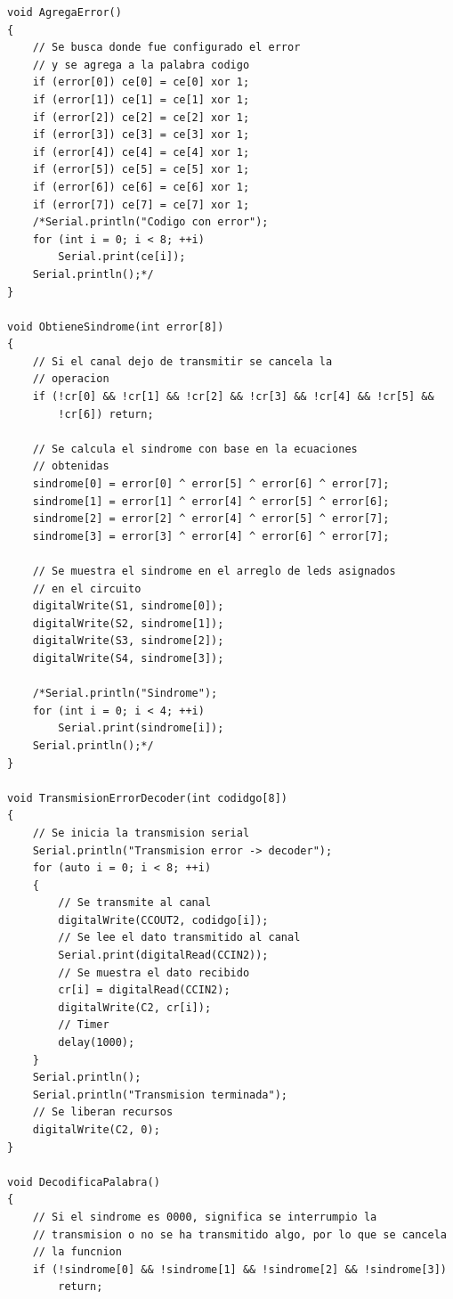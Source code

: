 \documentclass[12pt,letterpaper]{article}
\begin{document}
\begin{lstlisting}[style=CStyle]
void AgregaError()
{
	// Se busca donde fue configurado el error
	// y se agrega a la palabra codigo
	if (error[0]) ce[0] = ce[0] xor 1;
	if (error[1]) ce[1] = ce[1] xor 1;
	if (error[2]) ce[2] = ce[2] xor 1;
	if (error[3]) ce[3] = ce[3] xor 1;
	if (error[4]) ce[4] = ce[4] xor 1;
	if (error[5]) ce[5] = ce[5] xor 1;
	if (error[6]) ce[6] = ce[6] xor 1;
	if (error[7]) ce[7] = ce[7] xor 1;
	/*Serial.println("Codigo con error");
	for (int i = 0; i < 8; ++i)
		Serial.print(ce[i]);
	Serial.println();*/
}

void ObtieneSindrome(int error[8])
{
	// Si el canal dejo de transmitir se cancela la 
	// operacion
	if (!cr[0] && !cr[1] && !cr[2] && !cr[3] && !cr[4] && !cr[5] &&
		!cr[6]) return;

	// Se calcula el sindrome con base en la ecuaciones 
	// obtenidas
	sindrome[0] = error[0] ^ error[5] ^ error[6] ^ error[7];
	sindrome[1] = error[1] ^ error[4] ^ error[5] ^ error[6];
	sindrome[2] = error[2] ^ error[4] ^ error[5] ^ error[7];
	sindrome[3] = error[3] ^ error[4] ^ error[6] ^ error[7];

	// Se muestra el sindrome en el arreglo de leds asignados
	// en el circuito
	digitalWrite(S1, sindrome[0]);
	digitalWrite(S2, sindrome[1]);
	digitalWrite(S3, sindrome[2]);
	digitalWrite(S4, sindrome[3]);

	/*Serial.println("Sindrome");
	for (int i = 0; i < 4; ++i)
		Serial.print(sindrome[i]);
	Serial.println();*/
}

void TransmisionErrorDecoder(int codidgo[8])
{
	// Se inicia la transmision serial
	Serial.println("Transmision error -> decoder");
	for (auto i = 0; i < 8; ++i)
	{
		// Se transmite al canal
		digitalWrite(CCOUT2, codidgo[i]);
		// Se lee el dato transmitido al canal
		Serial.print(digitalRead(CCIN2));
		// Se muestra el dato recibido
		cr[i] = digitalRead(CCIN2);
		digitalWrite(C2, cr[i]);
		// Timer
		delay(1000);
	}
	Serial.println();
	Serial.println("Transmision terminada");
	// Se liberan recursos
	digitalWrite(C2, 0);
}

void DecodificaPalabra()
{
	// Si el sindrome es 0000, significa se interrumpio la 
	// transmision o no se ha transmitido algo, por lo que se cancela 
	// la funcnion
	if (!sindrome[0] && !sindrome[1] && !sindrome[2] && !sindrome[3])
		return;


\end{lstlisting}
\end{document}
